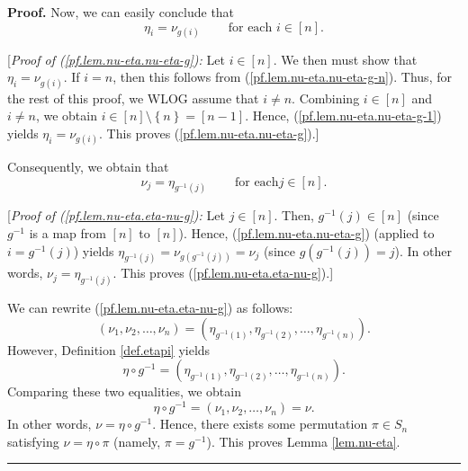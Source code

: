 \documentclass[numbers=enddot,12pt,final,onecolumn,notitlepage,english]{scrartcl}%
\theoremstyle{definition}
\newenvironment{proof}[1][Proof]{\noindent\textbf{#1.} }{\ \rule{0.5em}{0.5em}}
\newenvironment{verlong}{}{}
\begin{document}
\begin{verlong}
\begin{proof}
Now, we can easily conclude that%
\begin{equation}
\eta_{i}=\nu_{g\left(  i\right)  }\ \ \ \ \ \ \ \ \ \ \text{for each }%
i\in\left[  n\right]  . \label{pf.lem.nu-eta.nu-eta-g}%
\end{equation}


[\textit{Proof of (\ref{pf.lem.nu-eta.nu-eta-g}):} Let $i\in\left[  n\right]
$. We then must show that $\eta_{i}=\nu_{g\left(  i\right)  }$. If $i=n$, then
this follows from (\ref{pf.lem.nu-eta.nu-eta-g-n}). Thus, for the rest of this
proof, we WLOG assume that $i\neq n$. Combining $i\in\left[  n\right]  $ and
$i\neq n$, we obtain $i\in\left[  n\right]  \setminus\left\{  n\right\}
=\left[  n-1\right]  $. Hence, (\ref{pf.lem.nu-eta.nu-eta-g-1}) yields
$\eta_{i}=\nu_{g\left(  i\right)  }$. This proves
(\ref{pf.lem.nu-eta.nu-eta-g}).] \medskip

Consequently, we obtain that%
\begin{equation}
\nu_{j}=\eta_{g^{-1}\left(  j\right)  }\ \ \ \ \ \ \ \ \ \ \text{for each
}j\in\left[  n\right]  . \label{pf.lem.nu-eta.eta-nu-g}%
\end{equation}


[\textit{Proof of (\ref{pf.lem.nu-eta.eta-nu-g}):} Let $j\in\left[  n\right]
$. Then, $g^{-1}\left(  j\right)  \in\left[  n\right]  $ (since $g^{-1}$ is a
map from $\left[  n\right]  $ to $\left[  n\right]  $). Hence,
(\ref{pf.lem.nu-eta.nu-eta-g}) (applied to $i=g^{-1}\left(  j\right)  $)
yields $\eta_{g^{-1}\left(  j\right)  }=\nu_{g\left(  g^{-1}\left(  j\right)
\right)  }=\nu_{j}$ (since $g\left(  g^{-1}\left(  j\right)  \right)  =j$). In
other words, $\nu_{j}=\eta_{g^{-1}\left(  j\right)  }$. This proves
(\ref{pf.lem.nu-eta.eta-nu-g}).] \medskip

We can rewrite (\ref{pf.lem.nu-eta.eta-nu-g}) as follows:%
\[
\left(  \nu_{1},\nu_{2},\ldots,\nu_{n}\right)  =\left(  \eta_{g^{-1}\left(
1\right)  },\eta_{g^{-1}\left(  2\right)  },\ldots,\eta_{g^{-1}\left(
n\right)  }\right)  .
\]
However, Definition \ref{def.etapi} yields%
\[
\eta\circ g^{-1}=\left(  \eta_{g^{-1}\left(  1\right)  },\eta_{g^{-1}\left(
2\right)  },\ldots,\eta_{g^{-1}\left(  n\right)  }\right)  .
\]
Comparing these two equalities, we obtain%
\[
\eta\circ g^{-1}=\left(  \nu_{1},\nu_{2},\ldots,\nu_{n}\right)  =\nu.
\]
In other words, $\nu=\eta\circ g^{-1}$. Hence, there exists some permutation
$\pi\in S_{n}$ satisfying $\nu=\eta\circ\pi$ (namely, $\pi=g^{-1}$). This
proves Lemma \ref{lem.nu-eta}.
\end{proof}
\end{verlong}
\end{document}
